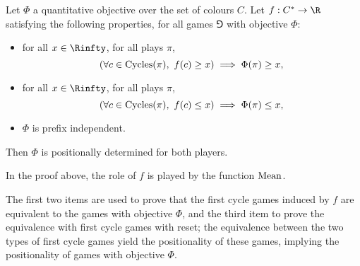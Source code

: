 \begin{theorem}
\label{4-thm:first_cycle_games}
Let $\Phi$ a quantitative objective over the set of colours $C$.
Let $f : C^* \to \R$ satisfying the following properties,
for all games $\Game$ with objective $\Phi$:
\begin{itemize}
	\item for all $x \in \Rinfty$, for all plays $\pi$, 
	\[
	(\forall c \in \mathrm{Cycles}(\pi),\ f(c) \ge x) \implies \Phi(\pi) \ge x,
	\]
	\item for all $x \in \Rinfty$, for all plays $\pi$, 
	\[
	(\forall c \in \mathrm{Cycles}(\pi),\ f(c) \le x) \implies \Phi(\pi) \le x,
	\]
	\item $\Phi$ is prefix independent.
\end{itemize}
Then $\Phi$ is positionally determined for both players.
\end{theorem}
In the proof above, the role of $f$ is played by the function $\mathrm{Mean}$.

The first two items are used to prove that the first cycle games induced by $f$ are equivalent to the games with objective $\Phi$,
and the third item to prove the equivalence with first cycle games with reset;
the equivalence between the two types of first cycle games yield the positionality of these games,
implying the positionality of games with objective $\Phi$.

